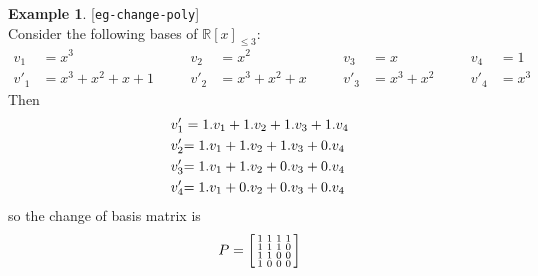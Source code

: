 \documentclass{amsart}
\newcommand{\lbl}[1]{\label{#1}\textup{[\texttt{#1}]}\ \\}
\newcommand{\lbl}{\label}
\newcommand{\R}         {{\mathbb{R}}}
\newcommand{\bsm}       {\left[\begin{smallmatrix}}
\newcommand{\esm}       {\end{smallmatrix}\right]}
\renewcommand{\:}       {\colon}
\theoremstyle{definition}
\newtheorem{example}[theorem]{Example}
\begin{document}
\begin{example}\lbl{eg-change-poly}
 {Consider the following bases of $\R[x]_{\leq 3}$:
 {\small \[ \begin{array}{rlcrlcrlcrl}
     v_1  &= x^3 &\hspace{1em}&
     v_2  &= x^2 &\hspace{1em}&
     v_3  &= x   &\hspace{1em}&
     v_4  &= 1   \\
     {v'_1} &{=x^3+x^2+x+1} &\hspace{1em}&
     {v'_2} &{=x^3+x^2+x}   &\hspace{1em}&
     {v'_3} &{=x^3+x^2}   &\hspace{1em}&
     {v'_4} &{=x^3}
    \end{array}
 \]}}
 {Then
 \begin{align*}
  v'_1 &= {1}.v_1 + {1}.v_2 + {1}.v_3 + {1}.v_4 \\
  {v'_2} &{= {1}.v_1 + {1}.v_2 + {1}.v_3 + {0}.v_4} \\
  {v'_3} &{= {1}.v_1 + {1}.v_2 + {0}.v_3 + {0}.v_4} \\
  {v'_4} &{= {1}.v_1 + {0}.v_2 + {0}.v_3 + {0}.v_4}
 \end{align*}}
 {so the change of basis matrix is
 \[ P = \bsm 
     \RED{1} & \OLG{1} & \BLUE{1} & \ORANGE{1} \\
     \RED{1} & \OLG{1} & \BLUE{1} & \ORANGE{0} \\
     \RED{1} & \OLG{1} & \BLUE{0} & \ORANGE{0} \\
     \RED{1} & \OLG{0} & \BLUE{0} & \ORANGE{0} 
    \esm
 \]}
\end{example}
\end{document}
